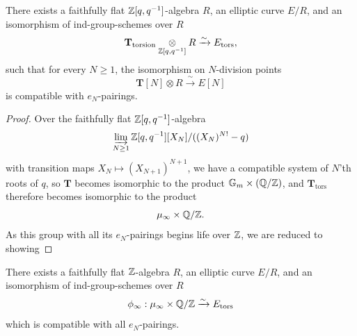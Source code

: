 \begin{kthm}\label{thm:8.7.5}
There exists a faithfully flat $\mathbb{Z}[q,q^{-1}]$-algebra $R$, an elliptic curve $E/R$, and an isomorphism of ind-group-schemes over $R$
\[
\mathbf{T}_{\mathrm{torsion}} \underset{\mathbb{Z}[q,q^{-1}]}{\otimes} R \xrightarrow{\sim} E_{\mathrm{tors}} ,
\]
such that for every $N \ge 1$, the isomorphism on $N$-division points
\[
\mathbf{T}[N] \otimes R \xrightarrow{\ \sim\ } E[N]
\]
is compatible with $e_N$-pairings.
\end{kthm}

\begin{proof}
Over the faithfully flat $\mathbb{Z}[q,q^{-1}]$-algebra
\[
\varinjlim_{N \ge 1} \mathbb{Z}[q,q^{-1}][X_N]/((X_N)^{N!} - q)
\]
with transition maps $X_N \mapsto (X_{N+1})^{N+1}$, we have a compatible system of $N$'th roots of $q$, so $\mathbf{T}$ becomes isomorphic to the product $\mathbb{G}_m \times (\mathbb{Q}/\mathbb{Z})$, and $\mathbf{T}_{\mathrm{tors}}$ therefore becomes isomorphic to the product
\[
\mu_{\infty} \times \mathbb{Q}/\mathbb{Z} .
\]
As this group with all its $e_N$-pairings begins life over $\mathbb{Z}$, we are reduced to showing
\renewcommand{\qedsymbol}{}
\end{proof}

\begin{klem}\label{lem:8.7.6}
There exists a faithfully flat $\mathbb{Z}$-algebra $R$, an elliptic curve $E/R$, and an isomorphism of ind-group-schemes over $R$
\[
\phi_{\infty} : \mu_{\infty} \times \mathbb{Q}/\mathbb{Z} \xrightarrow{\sim} E_{\mathrm{tors}}
\]
which is compatible with all $e_N$-pairings.
\end{klem}

